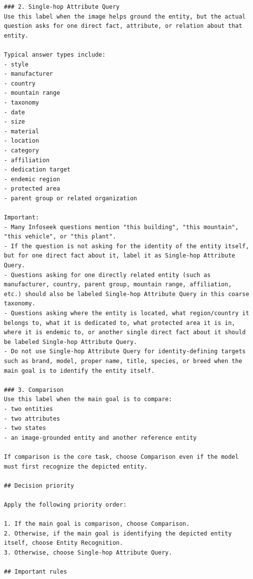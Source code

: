 \begin{verbatim}
### 2. Single-hop Attribute Query
Use this label when the image helps ground the entity, but the actual question asks for one direct fact, attribute, or relation about that entity.

Typical answer types include:
- style
- manufacturer
- country
- mountain range
- taxonomy
- date
- size
- material
- location
- category
- affiliation
- dedication target
- endemic region
- protected area
- parent group or related organization

Important:
- Many Infoseek questions mention "this building", "this mountain", "this vehicle", or "this plant".
- If the question is not asking for the identity of the entity itself, but for one direct fact about it, label it as Single-hop Attribute Query.
- Questions asking for one directly related entity (such as manufacturer, country, parent group, mountain range, affiliation, etc.) should also be labeled Single-hop Attribute Query in this coarse taxonomy.
- Questions asking where the entity is located, what region/country it belongs to, what it is dedicated to, what protected area it is in, where it is endemic to, or another single direct fact about it should be labeled Single-hop Attribute Query.
- Do not use Single-hop Attribute Query for identity-defining targets such as brand, model, proper name, title, species, or breed when the main goal is to identify the entity itself.

### 3. Comparison
Use this label when the main goal is to compare:
- two entities
- two attributes
- two states
- an image-grounded entity and another reference entity

If comparison is the core task, choose Comparison even if the model must first recognize the depicted entity.

## Decision priority

Apply the following priority order:

1. If the main goal is comparison, choose Comparison.
2. Otherwise, if the main goal is identifying the depicted entity itself, choose Entity Recognition.
3. Otherwise, choose Single-hop Attribute Query.

## Important rules


\end{verbatim}
